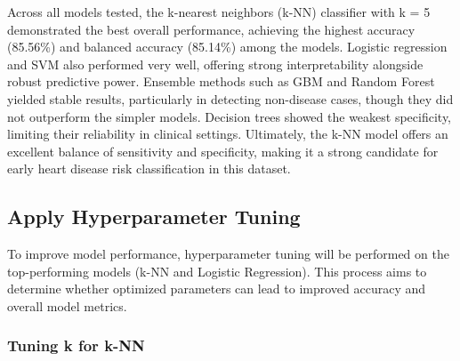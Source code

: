 \documentclass[
]{article}
\begin{document}
Across all models tested, the k-nearest neighbors (k-NN) classifier with
k = 5 demonstrated the best overall performance, achieving the highest
accuracy (85.56\%) and balanced accuracy (85.14\%) among the models.
Logistic regression and SVM also performed very well, offering strong
interpretability alongside robust predictive power. Ensemble methods
such as GBM and Random Forest yielded stable results, particularly in
detecting non-disease cases, though they did not outperform the simpler
models. Decision trees showed the weakest specificity, limiting their
reliability in clinical settings. Ultimately, the k-NN model offers an
excellent balance of sensitivity and specificity, making it a strong
candidate for early heart disease risk classification in this dataset.

\subsection{Apply Hyperparameter
Tuning}\label{apply-hyperparameter-tuning}

To improve model performance, hyperparameter tuning will be performed on
the top-performing models (k-NN and Logistic Regression). This process
aims to determine whether optimized parameters can lead to improved
accuracy and overall model metrics.

\subsubsection{Tuning k for k-NN}\label{tuning-k-for-k-nn}
\end{document}
